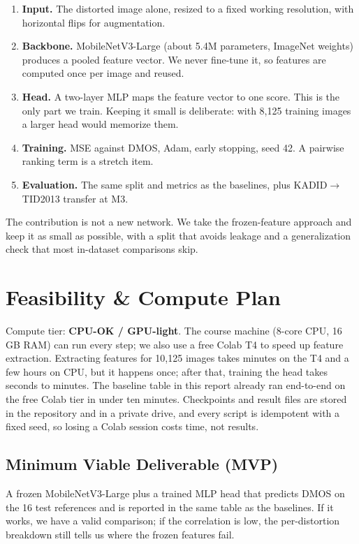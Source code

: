 \documentclass[11pt]{article}
\begin{document}
\begin{enumerate}[leftmargin=*]
  \item \textbf{Input.} The distorted image alone, resized to a fixed working resolution,
        with horizontal flips for augmentation.
  \item \textbf{Backbone.} MobileNetV3-Large (about 5.4M parameters, ImageNet weights)
        produces a pooled feature vector. We never fine-tune it, so features are computed
        once per image and reused.
  \item \textbf{Head.} A two-layer MLP maps the feature vector to one score. This is the
        only part we train. Keeping it small is deliberate: with 8,125 training images a
        larger head would memorize them.
  \item \textbf{Training.} MSE against DMOS, Adam, early stopping, seed 42. A pairwise
        ranking term is a stretch item.
  \item \textbf{Evaluation.} The same split and metrics as the baselines, plus
        KADID$\rightarrow$TID2013 transfer at M3.
\end{enumerate}

The contribution is not a new network. We take the frozen-feature approach and keep it as
small as possible, with a split that avoids leakage and a generalization check that most
in-dataset comparisons skip.

\section{Feasibility \& Compute Plan}
\label{sec:feasibility}
Compute tier: \textbf{CPU-OK / GPU-light}. The course machine (8-core CPU, 16\,GB RAM) can
run every step; we also use a free Colab T4 to speed up feature extraction. Extracting
features for 10,125 images takes minutes on the T4 and a few hours on CPU, but it happens
once; after that, training the head takes seconds to minutes. The baseline table in this
report already ran end-to-end on the free Colab tier in under ten minutes. Checkpoints and
result files are stored in the repository and in a private drive, and every script is
idempotent with a fixed seed, so losing a Colab session costs time, not results.

\subsection{Minimum Viable Deliverable (MVP)}
A frozen MobileNetV3-Large plus a trained MLP head that predicts DMOS on the 16 test
references and is reported in the same table as the baselines. If it works, we have a valid
comparison; if the correlation is low, the per-distortion breakdown still tells us where
the frozen features fail.
\end{document}
